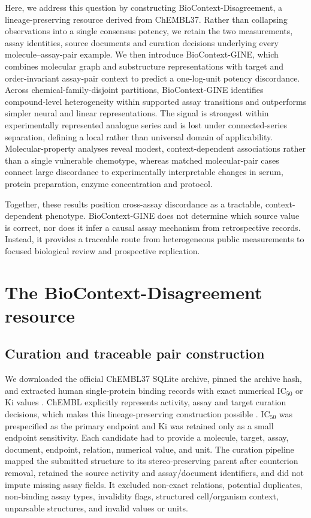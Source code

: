 \documentclass[letterpaper]{article}
\begin{document}
Here, we address this question by constructing BioContext-Disagreement, a lineage-preserving resource derived from ChEMBL37. Rather than collapsing observations into a single consensus potency, we retain the two measurements, assay identities, source documents and curation decisions underlying every molecule--assay-pair example. We then introduce BioContext-GINE, which combines molecular graph and substructure representations with target and order-invariant assay-pair context to predict a one-log-unit potency discordance. Across chemical-family-disjoint partitions, BioContext-GINE identifies compound-level heterogeneity within supported assay transitions and outperforms simpler neural and linear representations. The signal is strongest within experimentally represented analogue series and is lost under connected-series separation, defining a local rather than universal domain of applicability. Molecular-property analyses reveal modest, context-dependent associations rather than a single vulnerable chemotype, whereas matched molecular-pair cases connect large discordance to experimentally interpretable changes in serum, protein preparation, enzyme concentration and protocol.

Together, these results position cross-assay discordance as a tractable, context-dependent phenotype. BioContext-GINE does not determine which source value is correct, nor does it infer a causal assay mechanism from retrospective records. Instead, it provides a traceable route from heterogeneous public measurements to focused biological review and prospective replication.

\section{The BioContext-Disagreement resource}

\subsection{Curation and traceable pair construction}

We downloaded the official ChEMBL37 SQLite archive, pinned the archive hash, and extracted human single-protein binding records with exact numerical IC$_{50}$ or Ki values \citep{chembl2023,chembl37}. ChEMBL explicitly represents activity, assay and target curation decisions, which makes this lineage-preserving construction possible \citep{mendez2019chembl,papadatos2015curation}. IC$_{50}$ was prespecified as the primary endpoint and Ki was retained only as a small endpoint sensitivity. Each candidate had to provide a molecule, target, assay, document, endpoint, relation, numerical value, and unit. The curation pipeline mapped the submitted structure to its stereo-preserving parent after counterion removal, retained the source activity and assay/document identifiers, and did not impute missing assay fields. It excluded non-exact relations, potential duplicates, non-binding assay types, invalidity flags, structured cell/organism context, unparsable structures, and invalid values or units.
\end{document}
